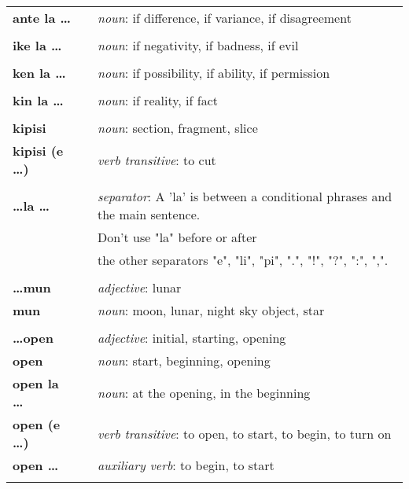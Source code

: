 \begin{supertabular}{p{2,5cm}|ll}
\textbf{ante la \dots} && \textit{noun}: if difference, if variance, if disagreement  \\ %
 && \\ %
\textbf{ike la \dots} && \textit{noun}: if negativity, if badness, if evil \\ %
 && \\ %
\textbf{ken la \dots} && \textit{noun}: if possibility, if ability, if permission \\ %
 && \\ %
\textbf{kin la \dots} && \textit{noun}: if reality, if fact \\  %
 && \\ %
\textbf{kipisi } && \textit{noun}: section, fragment, slice \\ %
\textbf{kipisi (e \dots)} && \textit{verb transitive}: to cut \\ %
 && \\ %
\textbf{\dots la \dots} && \textit{separator}: A 'la' is between a conditional phrases and the main sentence. \\ &&  Don't use "la" before or after \\ && the other separators "e", "li", "pi", ".", "!", "?", ":", ",".  \\ %
 && \\ %
\textbf{\dots mun} && \textit{adjective}: lunar \\ %
\textbf{mun} && \textit{noun}: moon, lunar, night sky object, star \\ %
 && \\ %
\textbf{\dots open} && \textit{adjective}: initial, starting, opening \\ %
\textbf{open} && \textit{noun}: start, beginning, opening \\ %
\textbf{open la \dots} && \textit{noun}: at the opening, in the beginning  \\ %
\textbf{open (e \dots)} && \textit{verb transitive}: to open, to start, to begin, to turn on \\ %
\textbf{open \dots } && \textit{auxiliary verb}: to begin, to start \\ %
 && \\ %

\end{supertabular}
